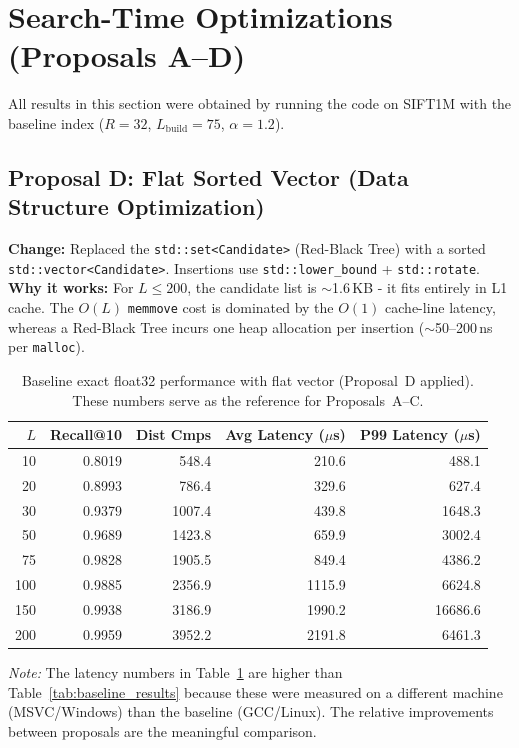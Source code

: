 \documentclass[10pt]{article}
\begin{document}
\section{Search-Time Optimizations (Proposals A--D)}

All results in this section were obtained by running the code on SIFT1M with the baseline index ($R=32$, $L_{\text{build}}=75$, $\alpha=1.2$).

\subsection{Proposal D: Flat Sorted Vector (Data Structure Optimization)}

\textbf{Change:} Replaced the \texttt{std::set<Candidate>} (Red-Black Tree) with a sorted \texttt{std::vector<Candidate>}. Insertions use \texttt{std::lower\_bound} + \texttt{std::rotate}. \textbf{Why it works:} For $L \leq 200$, the candidate list is $\sim$1.6\,KB - it fits entirely in L1 cache. The $O(L)$ \texttt{memmove} cost is dominated by the $O(1)$ cache-line latency, whereas a Red-Black Tree incurs one heap allocation per insertion ($\sim$50--200\,ns per \texttt{malloc}).

\begin{table}[H]
\centering
\begin{tabular}{rrrrr}
\toprule
$L$ & Recall@10 & Dist Cmps & Avg Latency ($\mu$s) & P99 Latency ($\mu$s) \\
\midrule
10  & 0.8019 & 548.4  & 210.6  & 488.1  \\
20  & 0.8993 & 786.4  & 329.6  & 627.4  \\
30  & 0.9379 & 1007.4 & 439.8  & 1648.3 \\
50  & 0.9689 & 1423.8 & 659.9  & 3002.4 \\
75  & 0.9828 & 1905.5 & 849.4  & 4386.2 \\
100 & 0.9885 & 2356.9 & 1115.9 & 6624.8 \\
150 & 0.9938 & 3186.9 & 1990.2 & 16686.6 \\
200 & 0.9959 & 3952.2 & 2191.8 & 6461.3  \\
\bottomrule
\end{tabular}
\caption{Baseline exact float32 performance with flat vector (Proposal~D applied). These numbers serve as the reference for Proposals~A--C.}
\label{tab:proposal_d}
\end{table}

\textit{Note:} The latency numbers in Table~\ref{tab:proposal_d} are higher than Table~\ref{tab:baseline_results} because these were measured on a different machine (MSVC/Windows) than the baseline (GCC/Linux). The relative improvements between proposals are the meaningful comparison.
\end{document}

